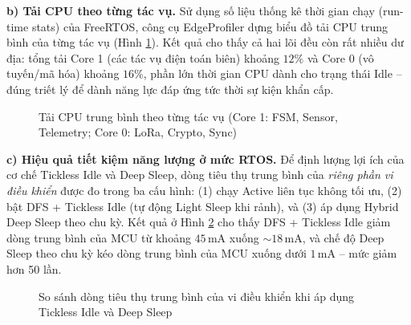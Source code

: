 \textbf{b) Tải CPU theo từng tác vụ.} Sử dụng số liệu thống kê thời gian chạy (run-time stats) của FreeRTOS, công cụ EdgeProfiler dựng biểu đồ tải CPU trung bình của từng tác vụ (Hình \ref{fig:ch5_cpu}). Kết quả cho thấy cả hai lõi đều còn rất nhiều dư địa: tổng tải Core 1 (các tác vụ điện toán biên) khoảng $12\%$ và Core 0 (vô tuyến/mã hóa) khoảng $16\%$, phần lớn thời gian CPU dành cho trạng thái Idle -- đúng triết lý để dành năng lực đáp ứng tức thời sự kiện khẩn cấp.

\begin{figure}[H]
\centering
{}
\caption{Tải CPU trung bình theo từng tác vụ (Core 1: FSM, Sensor, Telemetry; Core 0: LoRa, Crypto, Sync)}
\label{fig:ch5_cpu}
\end{figure}

\textbf{c) Hiệu quả tiết kiệm năng lượng ở mức RTOS.} Để định lượng lợi ích của cơ chế Tickless Idle và Deep Sleep, dòng tiêu thụ trung bình của \emph{riêng phần vi điều khiển} được đo trong ba cấu hình: (1) chạy Active liên tục không tối ưu, (2) bật DFS + Tickless Idle (tự động Light Sleep khi rảnh), và (3) áp dụng Hybrid Deep Sleep theo chu kỳ. Kết quả ở Hình \ref{fig:ch5_energy} cho thấy DFS + Tickless Idle giảm dòng trung bình của MCU từ khoảng $45\,\text{mA}$ xuống $\sim 18\,\text{mA}$, và chế độ Deep Sleep theo chu kỳ kéo dòng trung bình của MCU xuống dưới $1\,\text{mA}$ -- mức giảm hơn 50 lần.

\begin{figure}[H]
\centering
{}
\caption{So sánh dòng tiêu thụ trung bình của vi điều khiển khi áp dụng Tickless Idle và Deep Sleep}
\label{fig:ch5_energy}
\end{figure}

